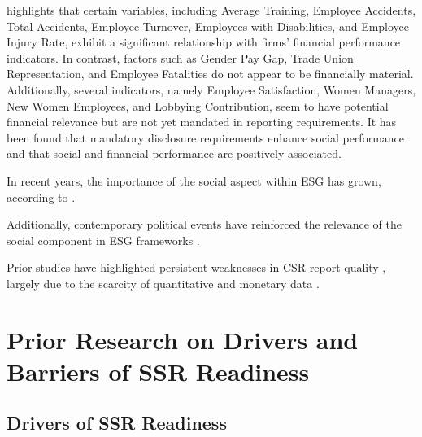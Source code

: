 \textcite{Bornar2025} highlights that certain variables, including Average Training, Employee Accidents, 
Total Accidents, Employee Turnover, Employees with Disabilities, and Employee Injury Rate, exhibit 
a significant relationship with firms' financial performance indicators. In contrast, factors such as Gender Pay Gap, 
Trade Union Representation, and Employee Fatalities do not appear to be financially material. Additionally, 
several indicators, namely Employee Satisfaction, Women Managers, New Women Employees, and Lobbying Contribution, 
seem to have potential financial relevance but are not yet mandated in reporting requirements.
It has been found that mandatory disclosure requirements enhance social performance and that social 
and financial performance are positively associated.

In recent years, the importance of the social aspect within ESG has grown, according to \textcite{BaidJayaraman2022}. 

Additionally, contemporary political events have reinforced the relevance of the social component in ESG frameworks 
\parencite{She2022}.

Prior studies have highlighted 
persistent weaknesses in CSR report quality \parencite{DiChiacchio2024}, largely due to the scarcity of 
quantitative and monetary data \parencite{Michelon2015}.

\section{Prior Research on Drivers and Barriers of SSR Readiness}

\subsection{Drivers of SSR Readiness}









